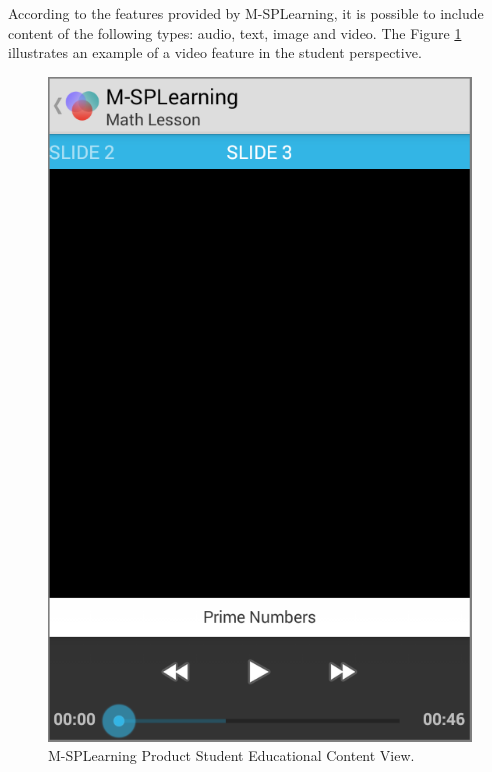 According to the features provided by M-SPLearning, it is possible to include content of the following types: audio, text, image and video. %
The Figure \ref{figureMSPLStudentView} illustrates an example of a video feature in the student perspective.

\begin{figure}[!ht]
\centering
\includegraphics[scale=0.265]{figures/section3/MSPLStudentView}
\caption{M-SPLearning Product Student Educational Content View.}
\label{figureMSPLStudentView}
\end{figure}

